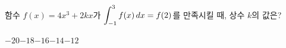 함수 $f(x)=4x^3+2kx$가 $\displaystyle\int_{-1}^{3} f(x)\mkern3mu dx=f(2)$를 만족시킬 때, 상수 $k$의 값은?
\begin{choices32}{$-20$}{$-18$}{$-16$}{$-14$}{$-12$}\end{choices32}
